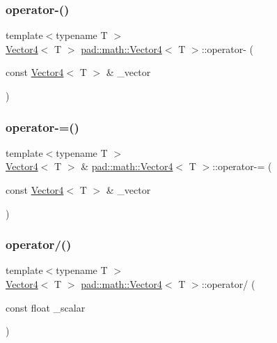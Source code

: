 \mbox{\label{structpad_1_1math_1_1_vector4_a05cc7e4f760aae9610025584d1608b50}} 
\subsubsection{\texorpdfstring{operator-\/()}{operator-()}}
{\footnotesize\ttfamily template$<$typename T $>$ \\
\mbox{\hyperlink{structpad_1_1math_1_1_vector4}{Vector4}}$<$ T $>$ \mbox{\hyperlink{structpad_1_1math_1_1_vector4}{pad\+::math\+::\+Vector4}}$<$ T $>$\+::operator-\/ (\begin{DoxyParamCaption}\item[{const \mbox{\hyperlink{structpad_1_1math_1_1_vector4}{Vector4}}$<$ T $>$ \&}]{\+\_\+vector }\end{DoxyParamCaption})}

\mbox{\label{structpad_1_1math_1_1_vector4_ae27aa6827d54b1b0033ee99e79d19660}} 
\subsubsection{\texorpdfstring{operator-\/=()}{operator-=()}}
{\footnotesize\ttfamily template$<$typename T $>$ \\
\mbox{\hyperlink{structpad_1_1math_1_1_vector4}{Vector4}}$<$ T $>$ \& \mbox{\hyperlink{structpad_1_1math_1_1_vector4}{pad\+::math\+::\+Vector4}}$<$ T $>$\+::operator-\/= (\begin{DoxyParamCaption}\item[{const \mbox{\hyperlink{structpad_1_1math_1_1_vector4}{Vector4}}$<$ T $>$ \&}]{\+\_\+vector }\end{DoxyParamCaption})}

\mbox{\label{structpad_1_1math_1_1_vector4_ad818def83cbc4255b79ec185450633ca}} 
\subsubsection{\texorpdfstring{operator/()}{operator/()}}
{\footnotesize\ttfamily template$<$typename T $>$ \\
\mbox{\hyperlink{structpad_1_1math_1_1_vector4}{Vector4}}$<$ T $>$ \mbox{\hyperlink{structpad_1_1math_1_1_vector4}{pad\+::math\+::\+Vector4}}$<$ T $>$\+::operator/ (\begin{DoxyParamCaption}\item[{const float}]{\+\_\+scalar }\end{DoxyParamCaption})}

